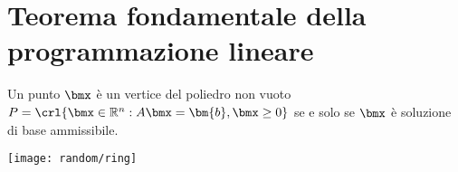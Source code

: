 \documentclass[\main/main.tex]{subfiles}
\begin{document}
\section{Teorema fondamentale della programmazione lineare}

\begin{minipage}{\textwidth}
  \begin{minipage}{.83\textwidth}
    \flushleft
    \begin{theorem}
      Un punto $\bmx$ è un vertice del poliedro non vuoto $P = \crl{\bmx \in \mathbb{R}^n: A\bmx = \bm{b}, \bmx \geq 0}$ se e solo se $\bmx$ è soluzione di base ammissibile.
    \end{theorem}
  \end{minipage}\hfill
  \begin{minipage}{0.15\textwidth}\center
    \texttt{[image: random/ring]}
  \end{minipage}
\end{minipage}
\end{document}
